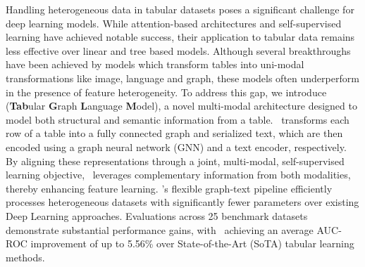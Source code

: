 Handling heterogeneous data in tabular datasets poses a significant challenge for deep learning models. While attention-based architectures and self-supervised learning have achieved notable success, their application to tabular data remains less effective over linear and tree based models.
Although several breakthroughs have been achieved by models which transform tables into uni-modal transformations like image, language and graph, these models often underperform in the presence of feature heterogeneity.
To address this gap, we introduce \textbf{\tabglm} (\textbf{Tab}ular \textbf{G}raph \textbf{L}anguage \textbf{M}odel), a novel multi-modal architecture designed to model both structural and semantic information from a table. 
\tabglm\ transforms each row of a table into a fully connected graph and serialized text, which are then encoded using a graph neural network (GNN) and a text encoder, respectively. By aligning these representations through a joint, multi-modal, self-supervised learning objective, \tabglm\ leverages complementary information from both modalities, thereby enhancing feature learning.
\tabglm's flexible graph-text pipeline efficiently processes heterogeneous datasets with significantly fewer parameters over existing Deep Learning approaches. Evaluations across 25 benchmark datasets demonstrate substantial performance gains, with \tabglm\ achieving an average AUC-ROC improvement of up to 5.56\% over State-of-the-Art (SoTA) tabular learning methods.
